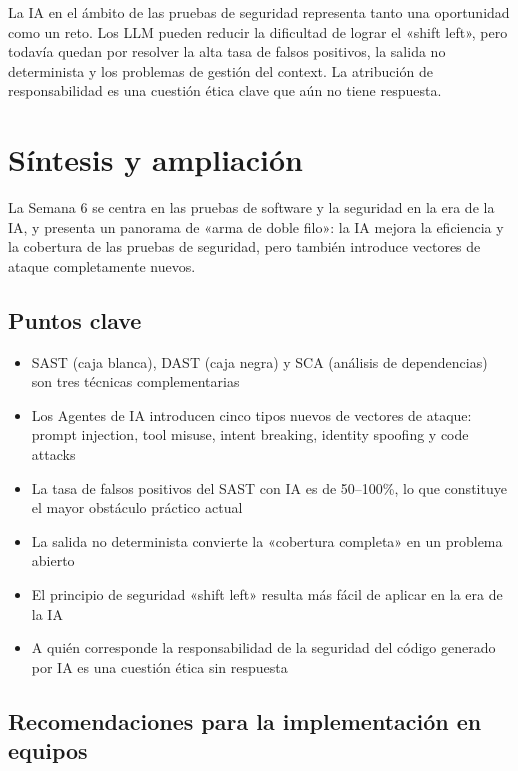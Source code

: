 \documentclass[a4paper]{article}
\begin{document}
La IA en el ámbito de las pruebas de seguridad representa tanto una oportunidad como un reto. Los LLM pueden reducir la dificultad de lograr el «shift left», pero todavía quedan por resolver la alta tasa de falsos positivos, la salida no determinista y los problemas de gestión del context. La atribución de responsabilidad es una cuestión ética clave que aún no tiene respuesta.

\section{Síntesis y ampliación}

La Semana 6 se centra en las pruebas de software y la seguridad en la era de la IA, y presenta un panorama de «arma de doble filo»: la IA mejora la eficiencia y la cobertura de las pruebas de seguridad, pero también introduce vectores de ataque completamente nuevos.

\subsection{Puntos clave}

\begin{itemize}
    \item SAST (caja blanca), DAST (caja negra) y SCA (análisis de dependencias) son tres técnicas complementarias
    \item Los Agentes de IA introducen cinco tipos nuevos de vectores de ataque: prompt injection, tool misuse, intent breaking, identity spoofing y code attacks
    \item La tasa de falsos positivos del SAST con IA es de 50--100\%, lo que constituye el mayor obstáculo práctico actual
    \item La salida no determinista convierte la «cobertura completa» en un problema abierto
    \item El principio de seguridad «shift left» resulta más fácil de aplicar en la era de la IA
    \item A quién corresponde la responsabilidad de la seguridad del código generado por IA es una cuestión ética sin respuesta
\end{itemize}

\subsection{Recomendaciones para la implementación en equipos}
\end{document}
